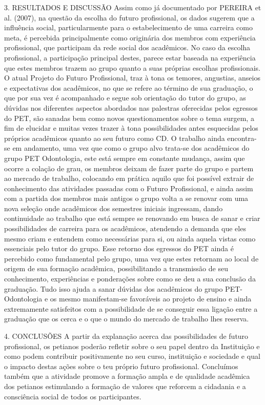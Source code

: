 3. RESULTADOS E DISCUSSÃO
Assim como já documentado por PEREIRA et al. (2007), na questão da escolha do futuro profissional, os dados sugerem que a influência social, particularmente para o estabelecimento de uma carreira como meta, é percebida principalmente como originária dos membros com experiência profissional, que participam da rede social dos acadêmicos. No caso da escolha profissional, a participação principal destes, parece estar baseada na experiência que estes membros trazem ao grupo quanto a suas próprias escolhas profissionais. O atual Projeto do Futuro Profissional, traz à tona os temores, angustias, anseios e expectativas dos acadêmicos, no que se refere ao término de sua graduação, o que por sua vez é acompanhado e segue sob orientação do tutor do grupo, as dúvidas nos diferentes aspectos abordados nas palestras oferecidas pelos egressos do PET, são sanadas bem como novos questionamentos sobre o tema surgem, a fim de elucidar e muitas vezes trazer à tona possibilidades antes esquecidas pelos próprios acadêmicos quanto ao seu futuro como CD. O trabalho ainda encontra-se em andamento, uma vez que como o grupo alvo trata-se dos acadêmicos do grupo PET Odontologia, este está sempre em constante mudança, assim que ocorre a colação de grau, os membros deixam de fazer parte do grupo e partem ao mercado de trabalho, colocando em prática aquilo que foi possível extrair de conhecimento das atividades passadas com o Futuro Profissional, e ainda assim com a partida dos membros mais antigos o grupo volta a se renovar com uma nova seleção onde acadêmicos dos semestres iniciais ingressam, dando 
continuidade ao trabalho que está sempre se renovando em busca de sanar e criar possibilidades de carreira para os acadêmicos, atendendo a demanda que eles mesmo criam e entendem como necessárias para si, ou ainda aquela vistas como essenciais pelo tutor do grupo. Esse retorno dos egressos do PET ainda é percebido como fundamental pelo grupo, uma vez que estes retornam ao local de origem de sua formação acadêmica, possibilitando a transmissão de seu conhecimento, experiências e ponderações sobre como se deu a sua conclusão da graduação. Tudo isso ajuda a sanar dúvidas dos acadêmicos do grupo PET- Odontologia e os mesmo manifestam-se favoráveis ao projeto de ensino e ainda extremamente satisfeitos com a possibilidade de se conseguir essa ligação entre a graduação que os cerca e o que o mundo do mercado de trabalho lhes reserva.

4. CONCLUSÕES
A partir da explanação acerca das possibilidades de futuro profissional, os petianos poderão refletir sobre o seu papel dentro da Instituição e como podem contribuir positivamente no seu curso, instituição e sociedade e qual o impacto destas ações sobre o teu próprio futuro profissional. Concluímos também que a atividade promove a formação ampla e de qualidade acadêmica dos petianos estimulando a formação de valores que reforcem a cidadania e a consciência social de todos os participantes.

